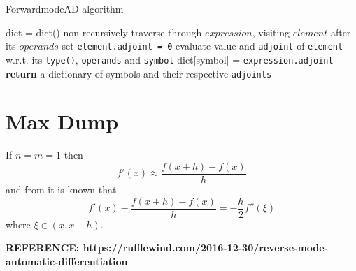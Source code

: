 \documentclass{article}
\begin{document}
\begin{algorithm}
\caption{ForwardmodeAD algorithm}\label{forwardAD}
\begin{algorithmic}[1]
\State dict = dict()
\State non recursively traverse through $expression$, visiting $element$ after its $operands$
    \State set \verb|element.adjoint = 0|
    \State evaluate value and \verb|adjoint| of \verb|element| w.r.t. its \verb|type()|, \verb|operands| and \verb|symbol|
    \State dict[symbol] = \verb|expression.adjoint|
    \EndFor
\EndFor
\State \textbf{return} a dictionary of symbols and their respective \verb|adjoints|
\EndProcedure
\end{algorithmic}
\end{algorithm}



\section{Max Dump}

If $n=m=1$ then
\begin{equation*}
    f'(x) \approx \frac{f(x+h)-f(x)}{h}
\end{equation*}
and from \cite{quarteroni} it is known that
\begin{equation*}
    f'(x) - \frac{f(x+h)-f(x)}{h} = - \frac{h}{2} f''(\xi)
\end{equation*}
where $\xi \in (x, x+h)$.

\textbf{REFERENCE: https://rufflewind.com/2016-12-30/reverse-mode-automatic-differentiation}
\end{document}

